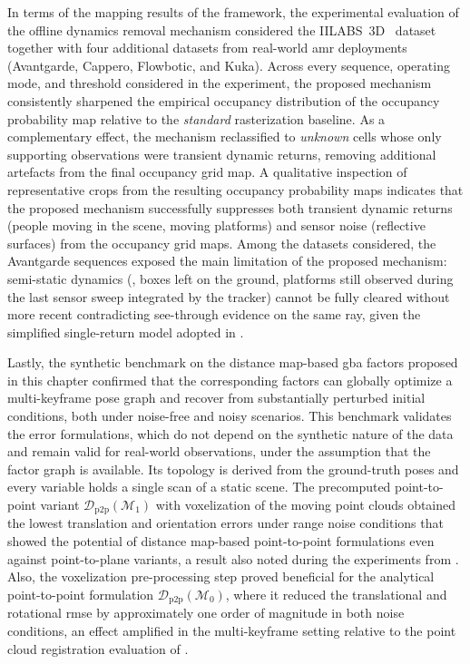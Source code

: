 In terms of the mapping results of the framework, the experimental
evaluation of the offline dynamics removal mechanism considered the
IILABS~3D~\cite{ribeiro:access:2025} dataset together with four
additional datasets from real-world \gls{amr} deployments (Avantgarde,
Cappero, Flowbotic, and Kuka). Across every sequence, operating mode,
and threshold considered in the experiment, the proposed mechanism
consistently sharpened the empirical occupancy distribution of the
occupancy probability map relative to the \emph{standard} rasterization baseline.
As a complementary effect, the mechanism reclassified to \emph{unknown}
cells whose only supporting observations were transient dynamic
returns, removing additional artefacts from the final occupancy grid map.
A qualitative inspection of representative crops from the resulting occupancy probability maps
indicates that the proposed mechanism successfully suppresses both transient dynamic returns
(people moving in the scene, moving platforms) and sensor noise
(reflective surfaces) from the occupancy grid maps. Among the datasets
considered, the Avantgarde sequences exposed the main limitation of the
proposed mechanism: semi-static dynamics (\eg, boxes left on the ground,
platforms still observed during the last sensor sweep integrated by the
tracker) cannot be fully cleared without more recent contradicting see-through
evidence on the same ray, given the simplified single-return model
adopted in .

Lastly, the synthetic benchmark on the distance map-based \gls{gba}
factors proposed in this chapter confirmed that the corresponding factors
can globally optimize a multi-keyframe pose graph and recover from
substantially perturbed initial conditions, both under noise-free and
noisy scenarios. This benchmark validates the error formulations, which do
not depend on the synthetic nature of the data and remain valid for
real-world observations, under the assumption that the factor graph is available. Its topology is derived from the ground-truth poses and
every variable holds a single scan of a static scene. The precomputed point-to-point variant
$\mathcal{D}_{\mathrm{p2p}}(\mathcal{M}_1)$ with voxelization of the
moving point clouds obtained the lowest translation and orientation errors
under range noise conditions that showed the potential of
distance map-based point-to-point formulations even against point-to-plane
variants, a result also noted during the experiments from .
Also, the voxelization pre-processing step proved beneficial for
the analytical point-to-point formulation $\mathcal{D}_{\mathrm{p2p}}(\mathcal{M}_0)$,
where it reduced the translational and rotational \gls{rmse} by approximately one order of
magnitude in both noise conditions, an effect amplified in the
multi-keyframe setting relative to the point cloud registration evaluation of
.

